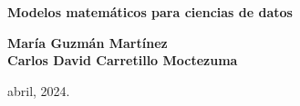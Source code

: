 \begin{minipage}[c][0.7\textheight][t]{0.85\textwidth}
  \begin{center}
  \vspace{2cm}
    {\huge  \textbf{Modelos matemáticos para ciencias de datos}}

    \vspace{2cm}

    {\Large \textbf{{María Guzmán Martínez \\Carlos David Carretillo Moctezuma}}}\\[40pt]



  \end{center}
   
\begin{flushright}
    {\large abril,  2024.}
 \end{flushright}
 
\end{minipage}